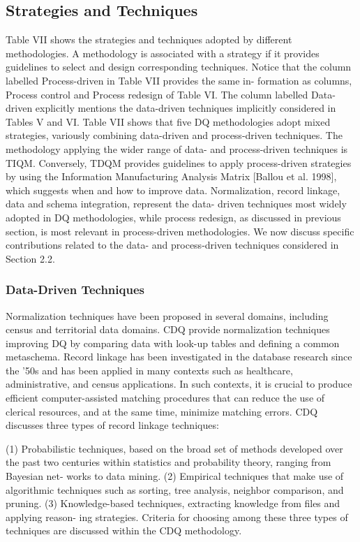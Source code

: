 \documentclass[pdftex,english,oribibl]{llncs}
\begin{document}
    \subsection{Strategies and Techniques}
    Table VII shows the strategies and techniques adopted by different methodologies. A methodology is associated with a strategy if it provides guidelines to select and design corresponding techniques.
    Notice that the column labelled Process-driven in Table VII provides the same in- formation as columns, Process control and Process redesign of Table VI. The column labelled Data-driven explicitly mentions the data-driven techniques implicitly considered in Tables V and VI.
    Table VII shows that five DQ methodologies adopt mixed strategies, variously combining data-driven and process-driven techniques. The methodology applying the wider range of data- and process-driven techniques is TIQM. Conversely, TDQM provides guidelines to apply process-driven strategies by using the Information Manufacturing Analysis Matrix [Ballou et al. 1998], which suggests when and how to improve data.
    Normalization, record linkage, data and schema integration, represent the data- driven techniques most widely adopted in DQ methodologies, while process redesign, as discussed in previous section, is most relevant in process-driven methodologies. We now discuss specific contributions related to the data- and process-driven techniques considered in Section 2.2.

    \subsubsection{Data-Driven Techniques}
    Normalization techniques have been proposed in several domains, including census and territorial data domains.
    CDQ provide normalization techniques improving DQ by comparing data with look-up tables and defining a common metaschema.
    Record linkage has been investigated in the database research since the ’50s and has been applied in many contexts such as healthcare, administrative, and census applications.
    In such contexts, it is crucial to produce efficient computer-assisted matching procedures that can reduce the use of clerical resources, and at the same time, minimize matching errors.
    CDQ discusses three types of record linkage techniques:

    (1) Probabilistic techniques, based on the broad set of methods developed over the past two centuries within statistics and probability theory, ranging from Bayesian net- works to data mining.
    (2) Empirical techniques that make use of algorithmic techniques such as sorting, tree analysis, neighbor comparison, and pruning.
    (3) Knowledge-based techniques, extracting knowledge from files and applying reason- ing strategies.
    Criteria for choosing among these three types of techniques are discussed within the CDQ methodology.
\end{document}
